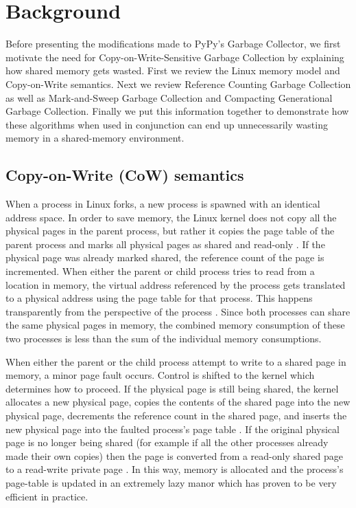 \documentclass{article}
\begin{document}
\begin{sloppypar}
\section{Background}\label{sec:background}

Before presenting the modifications made to PyPy's Garbage Collector, we first motivate the need for Copy-on-Write-Sensitive Garbage Collection by explaining how shared memory gets wasted.  First we review the Linux memory model and Copy-on-Write semantics.  Next we review Reference Counting Garbage Collection as well as Mark-and-Sweep Garbage Collection and Compacting Generational Garbage Collection.  Finally we put this information together to demonstrate how these algorithms when used in conjunction can end up unnecessarily wasting memory in a shared-memory environment.  

\subsection{Copy-on-Write (CoW) semantics}\label{sec:CoW}

When a process in Linux forks, a new process is spawned with an identical address space.  In order to save memory, the Linux kernel does not copy all the physical pages in the parent process, but rather it copies the page table of the parent process and marks all physical pages as shared and read-only \cite{VMM}.  If the physical page was already marked shared, the reference count of the page is incremented.  When either the parent or child process tries to read from a location in memory, the virtual address referenced by the process gets translated to a physical address using the page table for that process.  This happens transparently from the perspective of the process \cite{VMM}.  Since both processes can share the same physical pages in memory, the combined memory consumption of these two processes is less than the sum of the individual memory consumptions.

When either the parent or the child process attempt to write to a shared page in memory, a minor page fault occurs.  Control is shifted to the kernel which determines how to proceed.  If the physical page is still being shared, the kernel allocates a new physical page, copies the contents of the shared page into the new physical page, decrements the reference count in the shared page, and inserts the new physical page into the faulted process's page table \cite{VMM}.  If the original physical page is no longer being shared (for example if all the other processes already made their own copies) then the page is converted from a read-only shared page to a read-write private page \cite{VMM}.  In this way, memory is allocated and the process's page-table is updated in an extremely lazy manor which has proven to be very efficient in practice.  


\end{sloppypar}
\end{document}
